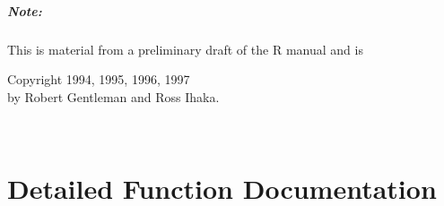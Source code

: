 \documentclass[a4paper]{book}
\begin{document}
\paragraph*{Note:}
This is material from a preliminary draft of the \textsf{R} manual and is 
\begin{center}
  Copyright 1994, 1995, 1996, 1997  \\ by Robert Gentleman and Ross Ihaka.
\end{center}

{ \ } %
\clearpage %

\chapter[Function Documentation]{Detailed Function Documentation}


\end{document}
